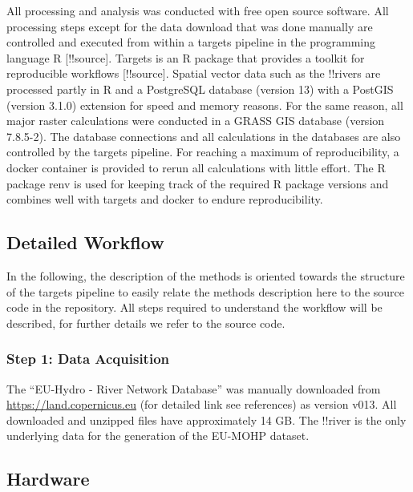 \documentclass[fleqn,10pt]{wlscirep}
\begin{document}
All processing and analysis was conducted with free open source software. All processing steps except for the data download that was done manually are controlled and executed from within a targets pipeline in the programming language R {[}!!source{]}. Targets is an R package that provides a toolkit for reproducible workflows {[}!!source{]}. Spatial vector data such as the !!rivers are processed partly in R and a PostgreSQL database (version 13) with a PostGIS (version 3.1.0) extension for speed and memory reasons. For the same reason, all major raster calculations were conducted in a GRASS GIS database (version 7.8.5-2). The database connections and all calculations in the databases are also controlled by the targets pipeline. For reaching a maximum of reproducibility, a docker container is provided to rerun all calculations with little effort. The R package renv is used for keeping track of the required R package versions and combines well with targets and docker to endure reproducibility.

\hypertarget{detailed-workflow}{%
\subsection*{Detailed Workflow}\label{detailed-workflow}}

In the following, the description of the methods is oriented towards the structure of the targets pipeline to easily relate the methods description here to the source code in the repository. All steps required to understand the workflow will be described, for further details we refer to the source code.

\hypertarget{step-1-data-acquisition}{%
\subsubsection*{Step 1: Data Acquisition}\label{step-1-data-acquisition}}

The ``EU-Hydro - River Network Database'' was manually downloaded from \url{https://land.copernicus.eu} (for detailed link see references) as version v013. All downloaded and unzipped files have approximately 14 GB. The !!river is the only underlying data for the generation of the EU-MOHP dataset.

\hypertarget{hardware}{%
\subsection*{Hardware}\label{hardware}}
\end{document}
